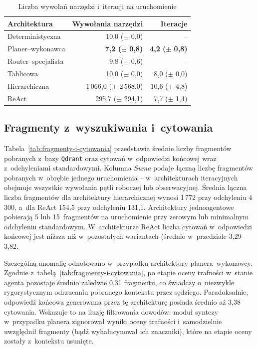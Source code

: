 \begin{table}[H]
  \caption{Liczba wywołań narzędzi i~iteracji na uruchomienie}\label{tab:wywolania-i-iteracje}
  \centering
  \small
  \renewcommand{\arraystretch}{1.3}
  \begin{tabular}{@{} l r r @{}}
    \toprule
    \textbf{Architektura}
    & \textbf{Wywołania narzędzi}     & \textbf{Iteracje}              \\
    \midrule
    Deterministyczna    & 10{,}0 (\(\pm\) 0{,}0)          & --                             \\
    Planer--wykonawca   & \textbf{7{,}2 (\(\pm\) 0{,}8)}  & \textbf{4{,}2 (\(\pm\) 0{,}8)} \\
    Router--specjalista & 9{,}8 (\(\pm\) 0{,}6)           & --                             \\
    Tablicowa           & 10{,}0 (\(\pm\) 0{,}0)          & 8{,}0 (\(\pm\) 0{,}0)          \\
    Hierarchiczna       & 1\,066{,}0 (\(\pm\) 2\,568{,}0) & 10{,}6 (\(\pm\) 4{,}8)         \\
    ReAct               & 295{,}7 (\(\pm\) 294{,}1)       & 7{,}7 (\(\pm\) 1{,}4)          \\
    \bottomrule
  \end{tabular}
\end{table}

\subsection{Fragmenty z~wyszukiwania i~cytowania}\label{subsec:fragmenty-i-cytowania}

Tabela~\ref{tab:fragmenty-i-cytowania} przedstawia średnie liczby fragmentów
pobranych z~bazy \texttt{Qdrant} oraz cytowań w~odpowiedzi końcowej wraz
z~odchyleniami standardowymi. Kolumna \textit{Suma} podaje łączną liczbę
fragmentów pobranych w~obrębie jednego uruchomienia -- w~architekturach
iteracyjnych obejmuje wszystkie wywołania pętli roboczej lub obserwacyjnej.
Średnia łączna liczba fragmentów dla architektury hierarchicznej wynosi 1\,772
przy odchyleniu 4\,300, a~dla ReAct 154{,}5 przy odchyleniu 131{,}1.
Architektury jednoagentowe pobierają 5 lub 15~fragmentów na uruchomienie przy
zerowym lub minimalnym odchyleniu standardowym. W~architekturze ReAct liczba
cytowań w~odpowiedzi końcowej jest niższa niż w~pozostałych wariantach (średnio
  w~przedziale 3{,}29--3{,}82.

  Szczególną anomalię odnotowano w~przypadku architektury planera--wykonawcy.
  Zgodnie z~tabelą~\ref{tab:fragmenty-i-cytowania}, po etapie oceny trafności
  w~stanie agenta pozostaje średnio zaledwie 0{,}31 fragmentu, co świadczy
  o~niezwykle rygorystycznym odrzucaniu pobranego kontekstu przez sędziego.
  Paradoksalnie, odpowiedź końcowa generowana przez tę architekturę posiada
  średnio aż 3{,}38 cytowania. Wskazuje to na iluzję filtrowania dowodów:
  moduł syntezy w~przypadku planera zignorował wyniki oceny trafności
  i~samodzielnie uwzględnił fragmenty (bądź wyhalucynował ich znaczniki),
  które na etapie oceny zostały z~kontekstu usunięte.

